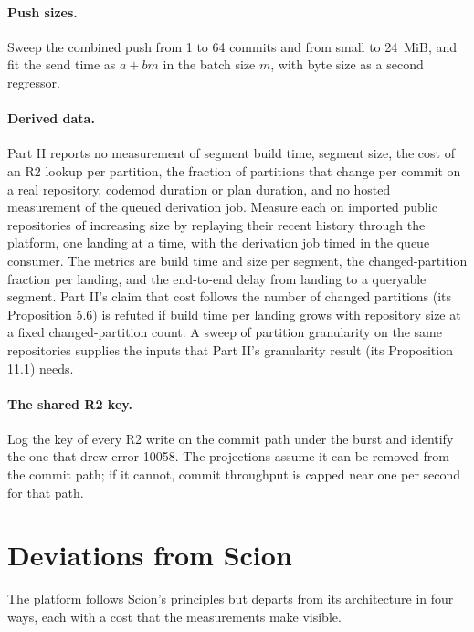 \documentclass[11pt,letterpaper]{article}
\theoremstyle{definition}
\theoremstyle{remark}
\begin{document}
\paragraph{Push sizes.} Sweep the combined push from 1 to 64 commits and from small to 24~MiB, and fit the send time as $a + bm$ in the batch size $m$, with byte size as a second regressor.

\paragraph{Derived data.} Part II reports no measurement of segment build time, segment size, the cost of an R2 lookup per partition, the fraction of partitions that change per commit on a real repository, codemod duration or plan duration, and no hosted measurement of the queued derivation job. Measure each on imported public repositories of increasing size by replaying their recent history through the platform, one landing at a time, with the derivation job timed in the queue consumer. The metrics are build time and size per segment, the changed-partition fraction per landing, and the end-to-end delay from landing to a queryable segment. Part II's claim that cost follows the number of changed partitions (its Proposition 5.6) is refuted if build time per landing grows with repository size at a fixed changed-partition count. A sweep of partition granularity on the same repositories supplies the inputs that Part II's granularity result (its Proposition 11.1) needs.

\paragraph{The shared R2 key.} Log the key of every R2 write on the commit path under the burst and identify the one that drew error 10058. %
The projections assume it can be removed from the commit path; if it cannot, commit throughput is capped near one per second for that path.

\section{Deviations from Scion}
\label{sec:sgoc:deviations}

The platform follows Scion's principles but departs from its architecture in four ways, each with a cost that the measurements make visible.
\end{document}

